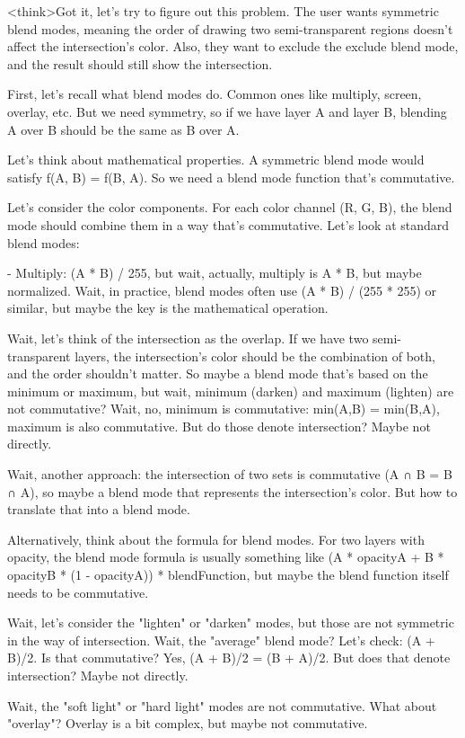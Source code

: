 <think>Got it, let's try to figure out this problem. The user wants symmetric blend modes, meaning the order of drawing two semi-transparent regions doesn't affect the intersection's color. Also, they want to exclude the exclude blend mode, and the result should still show the intersection. 

First, let's recall what blend modes do. Common ones like multiply, screen, overlay, etc. But we need symmetry, so if we have layer A and layer B, blending A over B should be the same as B over A. 

Let's think about mathematical properties. A symmetric blend mode would satisfy f(A, B) = f(B, A). So we need a blend mode function that's commutative. 

Let's consider the color components. For each color channel (R, G, B), the blend mode should combine them in a way that's commutative. Let's look at standard blend modes:

- Multiply: (A * B) / 255, but wait, actually, multiply is A * B, but maybe normalized. Wait, in practice, blend modes often use (A * B) / (255 * 255) or similar, but maybe the key is the mathematical operation. 

Wait, let's think of the intersection as the overlap. If we have two semi-transparent layers, the intersection's color should be the combination of both, and the order shouldn't matter. So maybe a blend mode that's based on the minimum or maximum, but wait, minimum (darken) and maximum (lighten) are not commutative? Wait, no, minimum is commutative: min(A,B) = min(B,A), maximum is also commutative. But do those denote intersection? Maybe not directly. 

Wait, another approach: the intersection of two sets is commutative (A ∩ B = B ∩ A), so maybe a blend mode that represents the intersection's color. But how to translate that into a blend mode. 

Alternatively, think about the formula for blend modes. For two layers with opacity, the blend mode formula is usually something like (A * opacityA + B * opacityB * (1 - opacityA)) * blendFunction, but maybe the blend function itself needs to be commutative. 

Wait, let's consider the "lighten" or "darken" modes, but those are not symmetric in the way of intersection. Wait, the "average" blend mode? Let's check: (A + B)/2. Is that commutative? Yes, (A + B)/2 = (B + A)/2. But does that denote intersection? Maybe not directly. 

Wait, the "soft light" or "hard light" modes are not commutative. What about "overlay"? Overlay is a bit complex, but maybe not commutative. 

